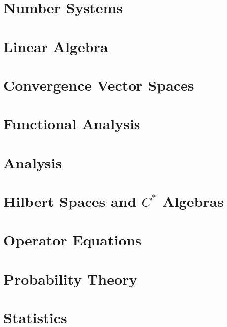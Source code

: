 \documentclass{report}
\begin{document}
\part{Number Systems}
\setcounter{chapter}{0} %


\part{Linear Algebra}
\setcounter{chapter}{0} %


\part{Convergence Vector Spaces}
\setcounter{chapter}{0} %


\part{Functional Analysis}
\setcounter{chapter}{0} %


\part{Analysis}
\setcounter{chapter}{0} %


\part{Hilbert Spaces and $C^*$ Algebras}
\setcounter{chapter}{0} %


\part{Operator Equations}
\setcounter{chapter}{0} %


\part{Probability Theory}
\setcounter{chapter}{0} %


\part{Statistics}
\setcounter{chapter}{0} %

\end{document}
